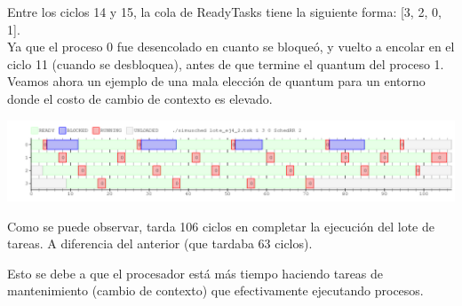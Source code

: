 Entre los ciclos 14 y 15, la cola de ReadyTasks tiene la siguiente forma:
[3, 2, 0, 1].\\
Ya que el proceso 0 fue desencolado en cuanto se bloqueó, y vuelto a encolar en el
ciclo 11 (cuando se desbloquea), antes de que termine el quantum del proceso 1.\\

Veamos ahora un ejemplo de una mala elección de quantum para un entorno donde el
costo de cambio de contexto es elevado.

\begin{center}
 \includegraphics[scale=0.48]{./RR/RR_example_3.png}
\end{center}

Como se puede observar, tarda 106 ciclos en completar la ejecución del lote de tareas.
A diferencia del anterior (que tardaba 63 ciclos).

Esto se debe a que el procesador está más tiempo haciendo tareas de mantenimiento (cambio de contexto)
que efectivamente ejecutando procesos.
